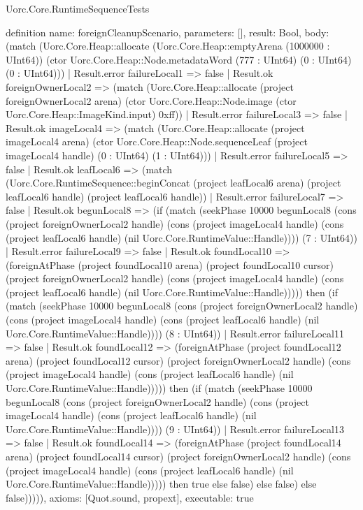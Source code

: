 \begin{lexlean}{Uorc.Core.RuntimeSequenceTests}
\begin{semanticmodule}
definition{
  name: foreignCleanupScenario,
  parameters: [],
  result: Bool,
  body: (match (Uorc.Core.Heap::allocate (Uorc.Core.Heap::emptyArena (1000000 : UInt64)) (ctor Uorc.Core.Heap::Node.metadataWord (777 : UInt64) (0 : UInt64) (0 : UInt64)))
    | Result.error failureLocal1 => false
    | Result.ok foreignOwnerLocal2 => (match (Uorc.Core.Heap::allocate (project foreignOwnerLocal2 arena) (ctor Uorc.Core.Heap::Node.image (ctor Uorc.Core.Heap::ImageKind.input) 0xff))
      | Result.error failureLocal3 => false
      | Result.ok imageLocal4 => (match (Uorc.Core.Heap::allocate (project imageLocal4 arena) (ctor Uorc.Core.Heap::Node.sequenceLeaf (project imageLocal4 handle) (0 : UInt64) (1 : UInt64)))
        | Result.error failureLocal5 => false
        | Result.ok leafLocal6 => (match (Uorc.Core.RuntimeSequence::beginConcat (project leafLocal6 arena) (project leafLocal6 handle) (project leafLocal6 handle))
          | Result.error failureLocal7 => false
          | Result.ok begunLocal8 => (if (match (seekPhase 10000 begunLocal8 (cons (project foreignOwnerLocal2 handle) (cons (project imageLocal4 handle) (cons (project leafLocal6 handle) (nil Uorc.Core.RuntimeValue::Handle)))) (7 : UInt64))
            | Result.error failureLocal9 => false
            | Result.ok foundLocal10 => (foreignAtPhase (project foundLocal10 arena) (project foundLocal10 cursor) (project foreignOwnerLocal2 handle) (cons (project imageLocal4 handle) (cons (project leafLocal6 handle) (nil Uorc.Core.RuntimeValue::Handle))))) then (if (match (seekPhase 10000 begunLocal8 (cons (project foreignOwnerLocal2 handle) (cons (project imageLocal4 handle) (cons (project leafLocal6 handle) (nil Uorc.Core.RuntimeValue::Handle)))) (8 : UInt64))
            | Result.error failureLocal11 => false
            | Result.ok foundLocal12 => (foreignAtPhase (project foundLocal12 arena) (project foundLocal12 cursor) (project foreignOwnerLocal2 handle) (cons (project imageLocal4 handle) (cons (project leafLocal6 handle) (nil Uorc.Core.RuntimeValue::Handle))))) then (if (match (seekPhase 10000 begunLocal8 (cons (project foreignOwnerLocal2 handle) (cons (project imageLocal4 handle) (cons (project leafLocal6 handle) (nil Uorc.Core.RuntimeValue::Handle)))) (9 : UInt64))
            | Result.error failureLocal13 => false
            | Result.ok foundLocal14 => (foreignAtPhase (project foundLocal14 arena) (project foundLocal14 cursor) (project foreignOwnerLocal2 handle) (cons (project imageLocal4 handle) (cons (project leafLocal6 handle) (nil Uorc.Core.RuntimeValue::Handle))))) then true else false) else false) else false))))),
  axioms: [Quot.sound, propext],
  executable: true
}


\end{semanticmodule}
\end{lexlean}
